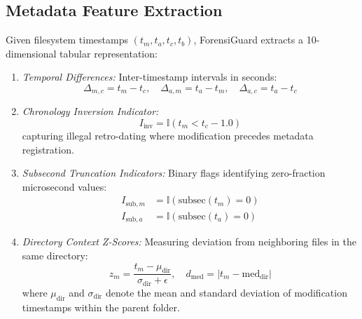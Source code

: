 \documentclass[conference]{IEEEtran}
\begin{document}
\subsection{Metadata Feature Extraction}
Given filesystem timestamps $(t_m, t_a, t_c, t_b)$, ForensiGuard extracts a 10-dimensional tabular representation:
\begin{enumerate}
    \item \textit{Temporal Differences:} Inter-timestamp intervals in seconds:
    \begin{equation}
        \Delta_{m,c} = t_m - t_c, \quad \Delta_{a,m} = t_a - t_m, \quad \Delta_{a,c} = t_a - t_c
    \end{equation}
    \item \textit{Chronology Inversion Indicator:} 
    \begin{equation}
        I_{\text{inv}} = \mathbb{I}(t_m < t_c - 1.0)
    \end{equation}
    capturing illegal retro-dating where modification precedes metadata registration.
    \item \textit{Subsecond Truncation Indicators:} Binary flags identifying zero-fraction microsecond values:
    \begin{align}
        I_{\text{sub},m} &= \mathbb{I}(\text{subsec}(t_m) = 0) \\
        I_{\text{sub},a} &= \mathbb{I}(\text{subsec}(t_a) = 0)
    \end{align}
    \item \textit{Directory Context Z-Scores:} Measuring deviation from neighboring files in the same directory:
    \begin{equation}
        z_m = \frac{t_m - \mu_{\text{dir}}}{\sigma_{\text{dir}} + \epsilon}, \quad d_{\text{med}} = |t_m - \text{med}_{\text{dir}}|
    \end{equation}
    where $\mu_{\text{dir}}$ and $\sigma_{\text{dir}}$ denote the mean and standard deviation of modification timestamps within the parent folder.
\end{enumerate}
\end{document}
